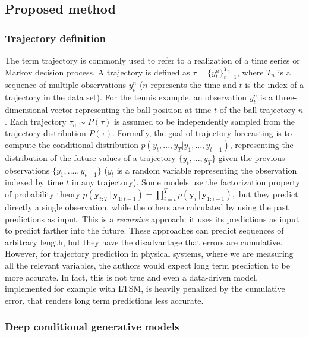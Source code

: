 \subsection{Proposed method}\label{header-n958}

\subsubsection{Trajectory definition}\label{header-n959}

The term trajectory is commonly used to refer to a realization of a time
series or Markov decision process. A trajectory is defined as
$\tau=\{y_t^{n}\}^{T_n}_{t=1}$, where $T_n$ is a sequence of
multiple observations $y_t^{n}$ ($n$ represents the time and $t$
is the index of a trajectory in the data set). For the tennis example,
an observation $y^{n}_t$ is a three-dimensional vector representing
the ball position at time $t$ of the ball trajectory $n$. Each
trajectory $\tau_n∼ P(\tau)$ is assumed to be independently sampled
from the trajectory distribution $P(\tau)$. Formally, the goal of
trajectory forecasting is to compute the conditional distribution
$p(y_t,..., y_T | y_1,..., y_{t−1})$, representing the distribution of
the future values of a trajectory $\{y_t,..., y_T \}$ given the
previous observations $\{y_1,...., y_{t-1}\}$ ($y_t$ is a random
variable representing the observation indexed by time $t$ in any
trajectory). Some models use the factorization property of probability
theory
\newline
$ p(\boldsymbol{y}_{t:T} \, | \,\boldsymbol{y}_{1:t-1}) = \prod _{i=t}^{T}{p(\boldsymbol{y}_{i} \, | \,\boldsymbol{y}_{1:i-1})}, $
\newline
but they predict directly a single observation, while the others are
calculated by using the past predictions as input. This is a
\emph{recursive} approach: it uses its predictions as input to predict
farther into the future. These approaches can predict sequences of
arbitrary length, but they have the disadvantage that errors are
cumulative. However, for trajectory prediction in physical systems,
where we are measuring all the relevant variables, the authors would
expect long term prediction to be more accurate. In fact, this is not
true and even a data-driven model, implemented for example with LTSM, is
heavily penalized by the cumulative error, that renders long term
predictions less accurate.

\subsubsection{Deep conditional generative models}\label{header-n963}

